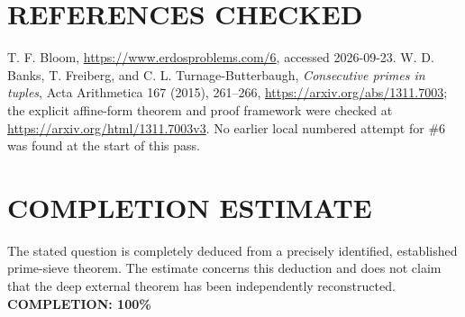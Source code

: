 \section{REFERENCES CHECKED}
T. F. Bloom, \url{https://www.erdosproblems.com/6}, accessed 2026-09-23. W. D. Banks, T. Freiberg, and C. L. Turnage-Butterbaugh, \emph{Consecutive primes in tuples}, Acta Arithmetica 167 (2015), 261--266, \url{https://arxiv.org/abs/1311.7003}; the explicit affine-form theorem and proof framework were checked at \url{https://arxiv.org/html/1311.7003v3}. No earlier local numbered attempt for \#6 was found at the start of this pass.

\section{COMPLETION ESTIMATE}
The stated question is completely deduced from a precisely identified, established prime-sieve theorem. The estimate concerns this deduction and does not claim that the deep external theorem has been independently reconstructed.
\textbf{COMPLETION: 100\%}
